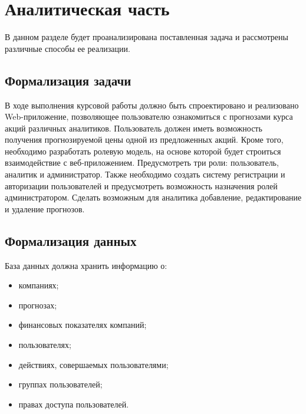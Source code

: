 \chapter{Аналитическая часть}

В данном разделе будет проанализирована поставленная задача и рассмотрены различные способы ее реализации.

\section{Формализация задачи}

В ходе выполнения курсовой работы должно быть спроектировано и реализовано Web-приложение, позволяющее пользователю ознакомиться с прогнозами курса акций различных аналитиков. Пользователь должен иметь возможность получения прогнозируемой цены одной из предложенных акций. 
Кроме того, необходимо разработать ролевую модель, на основе которой будет строиться взаимодействие с веб-приложением. Предусмотреть три роли: пользователь, аналитик и администратор. Также необходимо создать систему регистрации и авторизации пользователей и предусмотреть возможность назначения ролей администратором. Сделать возможным для аналитика добавление, редактирование и удаление прогнозов.


\section{Формализация данных} 
База данных должна хранить информацию о:
\begin{itemize}
	\item компаниях;
 	\item прогнозах;
  \item финансовых показателях компаний;
  \item пользователях;
  \item действиях, совершаемых пользователями;
  \item группах пользователей;
  \item правах доступа пользователей.  
\end{itemize}


